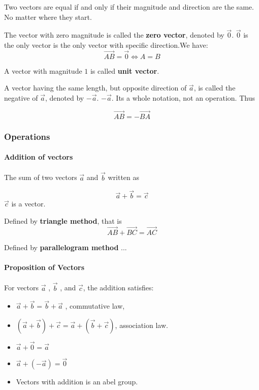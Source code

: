 \documentclass[11pt]{book}
\begin{document}
Two vectors are equal if and only if their magnitude and direction are the same. No matter where they start.

The vector with zero magnitude is called the \textbf{zero vector}, denoted by $\vec 0$. $\vec 0$ is the only vector is the only vector with specific direction.We have: 
$$
\overrightarrow {AB}=\vec 0 \iff A=B
$$

A vector with magnitude $1$ is called \textbf{ unit vector}.

A vector having the same length, but opposite direction of $\vec a$, is called the negative of $\vec a$, denoted by $-\vec a$. $-\vec a$. Its a whole notation, not an operation. Thus 

$$\overrightarrow  {AB}= - \overrightarrow  {BA}$$

\subsubsection{Operations}

\paragraph{Addition of vectors}

The sum of two vectors $\vec a$ and $\vec{b}$ written as

$$
\vec a +\vec b = \vec c
$$
$\vec c $ is a vector.


Defined by \textbf{triangle method}, that is
$$
\overrightarrow  {AB}+\overrightarrow  {BC}=\overrightarrow  {AC}
$$

Defined by \textbf{parallelogram  method} ...

\paragraph{Proposition of Vectors}

For vectors $\vec a$ , $\vec b$ , and $\vec c$, the addition satisfies:

\begin{itemize}

\item $\vec a+\vec b =\vec b+\vec a $ , commutative law, 

\item $(\vec a+\vec b)+\vec c= \vec a+(\vec b+\vec c) $, association law.

\item $\vec a+\vec 0=\vec a$

\item $\vec a+(-\vec a)=\vec 0$

\item Vectors with addition is an abel group. 

\end{itemize}
\end{document}
